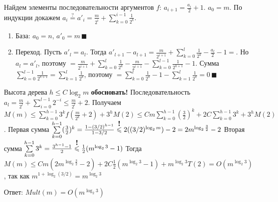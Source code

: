 \documentclass[a4paper]{article}
\begin{document}
\begin{enumerate}
\newline
Найдем элементы последовательности аргументов $f$:\newline
$a_{i+1}=\frac{a_i}{2}+1$. $a_0=m$. По индукции докажем $a_i\overset{?}{=}a'_i=\frac{m}{2^i}+\sum\limits_{k=0}^{i-1}\frac{1}{2^k}$.
\begin{enumerate}
\item База: $a_0=n$, $a'_0=m\,\blacksquare$
\item Переход. Пусть $a'_l=a_l$. Тогда $a'_{l+1}-a_{l+1}=\frac{m}{2^{i+1}}+\sum\limits_{k=0}^{l}\frac{1}{2^k}-\frac{a_l}{2}-1\boxed{=}$. Но $a_l=a'_l$, поэтому\newline
$\boxed{=}\frac{m}{2^{i+1}}+\sum\limits_{k=0}^{l}\frac{1}{2^k}-\frac{m}{2^{i+1}}-\sum\limits_{k=0}^{l-1}\frac{1}{2^{k+1}}-1$. Сумма $\sum\limits_{k=0}^{l-1}\frac{1}{2^{k+1}}=\sum\limits_{k=1}^{l}\frac{1}{2^k}$, поэтому $\boxed{=}\sum\limits_{k=0}^{l}\frac{1}{2^k}-1-\sum\limits_{k=1}^{l}\frac{1}{2^k}=0\,\blacksquare$
\end{enumerate}
Высота дерева $h\leqslant C\log_2 m$ {\bf обосновать!}\newline
Последовательность $a_l=\frac{m}{2^l}+\sum\limits_{i=0}^{l-1}2^{-i}\leqslant\frac{m}{2^l}+2$.
Получаем $M(m)\leqslant \sum\limits_{k=0}^{h-1}3^kf(\frac{m}{2^k}+2)+3^hM(2)\leqslant Cm\sum\limits_{k=0}^{h-1}(\frac{3}{2})^k+2C\sum\limits_{k=0}^{h-1}3^k+3^hM(2)$.
Первая сумма $\sum\limits_{k=0}^{h-1}(\frac{3}{2})^k=\frac{1-(3/2)^{h-1}}{1-3/2}\overset{\mbox{\bf !}}{\leqslant}2((3/2)^{\log_2 m})-2=2m^{\log_2 \frac{3}{2}}-2$\newline
Вторая сумма $\sum\limits_{k=0}^{h-1}3^k=\frac{3^{h-1}-1}{2}\overset{\mbox{\bf !}}{\leqslant}\frac{1}{2}(m^{\log_2 3}-1)$\newline
Тогда $M(m)\leqslant Cm(2m^{\log_2 \frac{3}{2}}-2)+2C\frac{1}{2}(m^{\log_2 3}-1)+m^{\log_2 3}T(2)=O(m^{\log_2 3})$, так как $m^{1+\log_2(3/2)}=m^{\log_2 3}$
\end{enumerate}
Ответ: $\boxed{Mult(m)=O(m^{\log_2 3})}$
\end{document}
